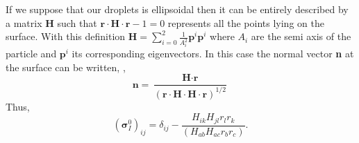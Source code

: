 If we suppose that our droplets is ellipsoidal then it can be entirely described by a matrix \textbf{H} such that $\textbf{r}\cdot \textbf{H}\cdot \textbf{r}- 1= 0$ represents all the points lying on the surface.
With this definition $\textbf{H} = \sum_{i=0}^{2} \frac{1}{A_i^2} \textbf{p}^i\textbf{p}^i$ where $A_i$ are the semi axis of the particle and $\textbf{p}^i$ its corresponding eigenvectors. 
In this case the normal vector \textbf{n} at the surface can be written, \citep{nadim1996concise},
\begin{equation*}
    \textbf{n} = \frac{\textbf{H}\cdot \textbf{r}}{(\textbf{r}\cdot \textbf{H}\cdot \textbf{H}\cdot \textbf{r})^{1/2}}
\end{equation*}
Thus, 
\begin{equation*}
    (\bm\sigma_I^0)_{ij}
    = \delta_{ij}
    - 
    \frac{H_{ik}H_{jl}r_lr_k}{(H_{ab}H_{ac}r_br_c)}. 
\end{equation*}


